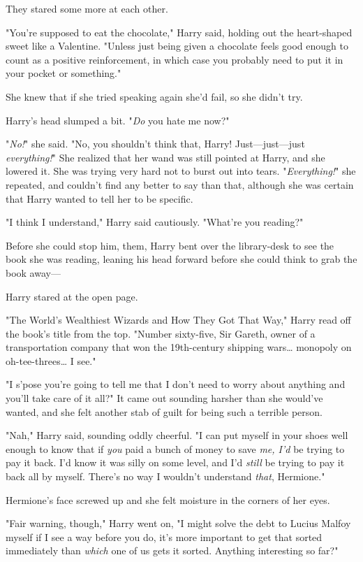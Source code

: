 They stared some more at each other.

"You're supposed to eat the chocolate," Harry said, holding out the
heart-shaped sweet like a Valentine. "Unless just being given a chocolate feels
good enough to count as a positive reinforcement, in which case you probably
need to put it in your pocket or something."

She knew that if she tried speaking again she'd fail, so she didn't try.

Harry's head slumped a bit. "\emph{Do} you hate me now?"

"\emph{No!}" she said. "No, you shouldn't think that, Harry! Just---just---just
\emph{everything!}" She realized that her wand was still pointed at Harry, and
she lowered it. She was trying very hard not to burst out into tears.
"\emph{Everything!}" she repeated, and couldn't find any better to say than
that, although she was certain that Harry wanted to tell her to be specific.

"I think I understand," Harry said cautiously. "What're you reading?"

Before she could stop him, them, Harry bent over the library-desk to see the
book she was reading, leaning his head forward before she could think to grab
the book away---

Harry stared at the open page.

"The World's Wealthiest Wizards and How They Got That Way," Harry read off the
book's title from the top. "Number sixty-five, Sir Gareth, owner of a
transportation company that won the 19th-century shipping wars{\ldots} monopoly
on oh-tee-threes{\ldots} I see."

"I s'pose you're going to tell me that I don't need to worry about anything and
you'll take care of it all?" It came out sounding harsher than she would've
wanted, and she felt another stab of guilt for being such a terrible person.

"Nah," Harry said, sounding oddly cheerful. "I can put myself in your shoes
well enough to know that if \emph{you} paid a bunch of money to save \emph{me,
I'd} be trying to pay it back. I'd know it was silly on some level, and I'd
\emph{still} be trying to pay it back all by myself. There's no way I wouldn't
understand \emph{that}, Hermione."

Hermione's face screwed up and she felt moisture in the corners of her eyes.

"Fair warning, though," Harry went on, "I might solve the debt to Lucius Malfoy
myself if I see a way before you do, it's more important to get that sorted
immediately than \emph{which} one of us gets it sorted. Anything interesting so
far?"

